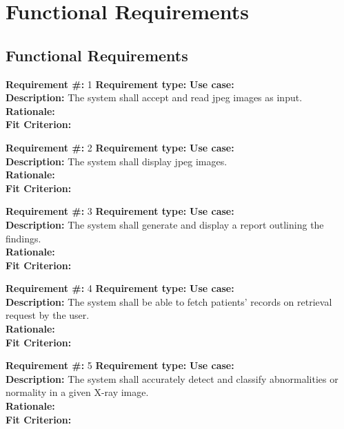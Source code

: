 \documentclass[12pt]{article}
\begin{document}
\section{Functional Requirements}
\subsection{Functional Requirements}
\textbf{Requirement \#:} 1 \hfill \textbf{Requirement type:} \hfill \textbf{Use case:}  \\
\textbf{Description:} The system shall accept and read jpeg images as input. \\
\textbf{Rationale: } \\
\textbf{Fit Criterion:}

\vspace{2mm}
\noindent
\textbf{Requirement \#:} 2 \hfill \textbf{Requirement type:} \hfill \textbf{Use case:} \\
\textbf{Description:} The system shall display jpeg images. \\
\textbf{Rationale: } \\
\textbf{Fit Criterion:} 

\vspace{2mm}
\noindent
\textbf{Requirement \#:} 3 \hfill \textbf{Requirement type:} \hfill \textbf{Use case:} \\
\textbf{Description:} The system shall generate and display a report outlining the findings.  \\
\textbf{Rationale: } \\
\textbf{Fit Criterion:}

\vspace{2mm}
\noindent
\textbf{Requirement \#:} 4 \hfill \textbf{Requirement type:} \hfill \textbf{Use case:} \\
\textbf{Description:} The system shall be able to fetch patients’ records on retrieval request by the user.  \\
\textbf{Rationale: } \\
\textbf{Fit Criterion:}

\vspace{2mm}
\noindent
\textbf{Requirement \#:} 5 \hfill \textbf{Requirement type:} \hfill \textbf{Use case:} \\
\textbf{Description:} The system shall accurately detect and classify abnormalities or normality in a given X-ray image.   \\
\textbf{Rationale: } \\
\textbf{Fit Criterion:}
\end{document}

